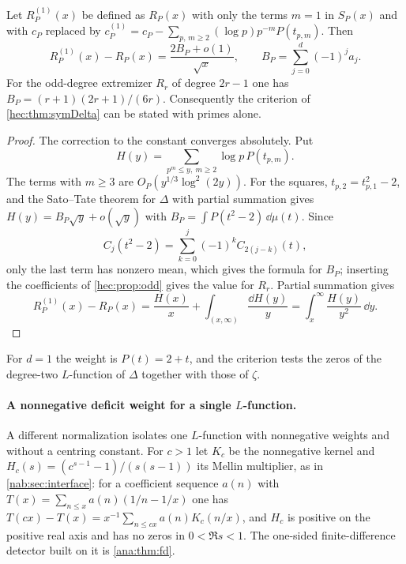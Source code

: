 \begin{proposition}\label{hec:prop:primeonlyDelta}
Let $R_P^{(1)}(x)$ be defined as $R_P(x)$ with only the terms $m=1$ in $S_P(x)$ and with $c_P$ replaced by
$c_P^{(1)}=c_P-\sum_{p,\,m\ge2}(\log p)p^{-m}P(t_{p,m})$. Then
\[
 R_P^{(1)}(x)-R_P(x)=\frac{2B_P+o(1)}{\sqrt x},\qquad B_P=\sum_{j=0}^d(-1)^ja_j .
\]
For the odd-degree extremizer $R_r$ of degree $2r-1$ one has $B_P=(r+1)(2r+1)/(6r)$. Consequently the
criterion of \cref{hec:thm:symDelta} can be stated with primes alone.
\end{proposition}

\begin{proof}
The correction to the constant converges absolutely. Put
\[
 H(y)=\sum_{p^m\le y,\ m\ge2}\log p\,P(t_{p,m}).
\]
The terms with $m\ge3$ are $O_P(y^{1/3}\log^2(2y))$. For
the squares, $t_{p,2}=t_{p,1}^2-2$, and the Sato--Tate theorem for $\Delta$ with partial summation gives
$H(y)=B_P\sqrt y+o(\sqrt y)$ with $B_P=\int P(t^2-2)\,\dd\mu(t)$. Since
\[
 C_j(t^2-2)=\sum_{k=0}^j(-1)^kC_{2(j-k)}(t),
\]
only the last term has nonzero mean, which gives the formula for $B_P$; inserting the coefficients of
\cref{hec:prop:odd} gives the value for $R_r$. Partial summation gives
\[
 R_P^{(1)}(x)-R_P(x)=\frac{H(x)}x+\int_{(x,\infty)}\frac{\dd H(y)}y=\int_x^\infty\frac{H(y)}{y^2}\,\dd y .
\]
\end{proof}

For $d=1$ the weight is $P(t)=2+t$, and the criterion tests the zeros of the degree-two $L$-function of
$\Delta$ together with those of $\zeta$.

\paragraph{A nonnegative deficit weight for a single $L$-function.}
A different normalization isolates one $L$-function with nonnegative weights and without a centring
constant. For $c>1$ let $K_c$ be the nonnegative kernel and $H_c(s)=(c^{s-1}-1)/(s(s-1))$ its Mellin
multiplier, as in \cref{nab:sec:interface}: for a coefficient sequence $a(n)$ with
$T(x)=\sum_{n\le x}a(n)(1/n-1/x)$ one has $T(cx)-T(x)=x^{-1}\sum_{n\le cx}a(n)K_c(n/x)$, and $H_c$ is
positive on the positive real axis and has no zeros in $0<\Re s<1$. The one-sided finite-difference
detector built on it is \cref{ana:thm:fd}.

